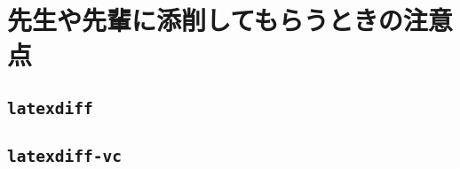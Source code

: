 \chapter{先生や先輩に添削してもらうときの注意点}
\label{ch:check}

\lipsum[1-10]

\section{\texttt{latexdiff}}
\label{sec:latexdiff}

\lipsum[1-8]


\section{\texttt{latexdiff-vc}}
\label{sec:latexdiff-vc}

